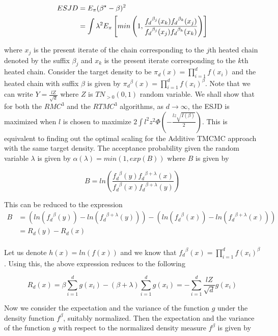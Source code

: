 \documentclass[11pt]{article}
\renewcommand{\b}{\ensuremath{\beta}}
\renewcommand{\l}{\lambda}
\begin{document}
\begin{align*}
ESJD & =  E_{\pi} (\beta^{\star} - \beta)^2  \\
	 & =  \int { \l^2 E_{\pi} \left [ min \left (1, \frac{\fjxk \fkxj}{\fjxj \fkxk} \right ) \right ]} \\
\end{align*} 

where $x_j$ is the present iterate of the chain corresponding to the $j$th heated chain denoted by the suffix $\beta_{j}$ and $x_{k}$ is the present iterate corresponding to the $k$th heated chain. Consider the target density to be $\pi_{d}(x) = \prod_{i=1}^{d} f(x_{i})$ and the heated chain with suffix $\beta$ is given by $ {\pi_{d}}^{\beta} (x) = \prod_{i=1}^{d} f(x_{i})^{\beta}$. Note that we can write $Y=\frac{lZ}{\sqrt{d}}$ where $Z$ is $TN_{>0}(0,1)$ random variable. We shall show that for both the $RMC^{3}$ and the $RTMC^{3}$ algorithms, as $d \rightarrow \infty$, the ESJD is maximized when $l$ is chosen to maximize $2\int {l^2 z^2 \Phi(-\frac{lz\sqrt{I(\beta)}}{2})}$. This is equivalent to finding out the optimal scaling for the Additive TMCMC approach with the same target density. The acceptance probability given the random variable $\l$ is given by $\alpha(\l) = min (1, exp(B))$ where $B$ is given by

\newcommand{\fby}{{f_d}^{\beta}(y)}
\newcommand{\fbex}{{f_d}^{\beta+\l}(x)}
\newcommand{\fbx}{{f_d}^{\beta}(x)}
\newcommand{\fbey}{{f_d}^{\beta+\l}(y)}

\[ B = ln \left (\frac{\fby \fbex}{\fbx \fbey} \right )     \]

This can be reduced to the expression
\begin{align*}
 B & = \left (ln(\fby) -ln(\fbey) \right) - \left (ln(\fbx) - ln(\fbex) \right) \\
	 & = R_{d}(y) -R_{d}(x)  \\
	 \end{align*}



Let us denote $h(x)=ln(f(x))$ and we know that $\fbx= \prod_{i=1}^{d} {f(x_i)^{\beta}}$. Using this, the above expression reduces to the following

\[ R_{d}(x)= \beta \sum_{i=1}^{d} g(x_{i}) -(\b+\l) \sum_{i=1}^{d} g(x_{i}) = -\sum_{i=1}^{d} \frac{lZ}{\sqrt{d}} g(x_{i}) \]

Now we consider the expectation and the variance of the function $g$ under the density function $f^{\beta}$, suitably normalized. Then the expectation and the variance of the function $g$ with respect to the normalized density measure $f^{\b}$ is given by 
\end{document}

